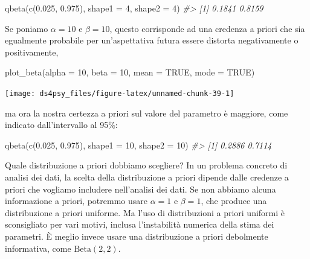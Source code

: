 \documentclass[
  11pt,
]{krantz}
\makeatletter
\newenvironment{Shaded}{\begin{snugshade}}{\end{snugshade}}
\newcommand{\AttributeTok}[1]{\textcolor[rgb]{0.61,0.61,0.61}{#1}}
\newcommand{\CommentTok}[1]{\textcolor[rgb]{0.37,0.37,0.37}{\textit{#1}}}
\newcommand{\ConstantTok}[1]{\textcolor[rgb]{0,0,0}{#1}}
\newcommand{\DecValTok}[1]{\textcolor[rgb]{0.06,0.06,0.06}{#1}}
\newcommand{\FloatTok}[1]{\textcolor[rgb]{0.06,0.06,0.06}{#1}}
\newcommand{\FunctionTok}[1]{\textcolor[rgb]{0,0,0}{#1}}
\newcommand{\NormalTok}[1]{#1}
\newenvironment{kframe}{%
\medskip{}
\setlength{\fboxsep}{.8em}
 \def\at@end@of@kframe{}%
 \ifinner\ifhmode%
  \def\at@end@of@kframe{\end{minipage}}%
  \begin{minipage}{\columnwidth}%
 \fi\fi%
 \def\FrameCommand##1{\hskip\@totalleftmargin \hskip-\fboxsep
 \colorbox{shadecolor}{##1}\hskip-\fboxsep
     \hskip-\linewidth \hskip-\@totalleftmargin \hskip\columnwidth}%
 \MakeFramed {\advance\hsize-\width
   \@totalleftmargin\z@ \linewidth\hsize
   \@setminipage}}%
 {\par\unskip\endMakeFramed%
 \at@end@of@kframe}
\renewenvironment{Shaded}{\begin{kframe}}{\end{kframe}}
\theoremstyle{definition}
\theoremstyle{definition}
\theoremstyle{definition}
\theoremstyle{definition}
\theoremstyle{remark}
\makeatother
\begin{document}
\begin{Shaded}
\begin{Highlighting}[]
\FunctionTok{qbeta}\NormalTok{(}\FunctionTok{c}\NormalTok{(}\FloatTok{0.025}\NormalTok{, }\FloatTok{0.975}\NormalTok{), }\AttributeTok{shape1 =} \DecValTok{4}\NormalTok{, }\AttributeTok{shape2 =} \DecValTok{4}\NormalTok{)}
\CommentTok{\#\textgreater{} [1] 0.1841 0.8159}
\end{Highlighting}
\end{Shaded}

Se poniamo \(\alpha=10\) e \(\beta=10\), questo corrisponde ad una credenza a priori che sia egualmente probabile per un'aspettativa futura essere distorta negativamente o positivamente,

\begin{Shaded}
\begin{Highlighting}[]
\FunctionTok{plot\_beta}\NormalTok{(}\AttributeTok{alpha =} \DecValTok{10}\NormalTok{, }\AttributeTok{beta =} \DecValTok{10}\NormalTok{, }\AttributeTok{mean =} \ConstantTok{TRUE}\NormalTok{, }\AttributeTok{mode =} \ConstantTok{TRUE}\NormalTok{)}
\end{Highlighting}
\end{Shaded}

\begin{center}\texttt{[image: ds4psy\_files/figure-latex/unnamed-chunk-39-1]} \end{center}

ma ora la nostra certezza a priori sul valore del parametro è maggiore, come indicato dall'intervallo al 95\%:

\begin{Shaded}
\begin{Highlighting}[]
\FunctionTok{qbeta}\NormalTok{(}\FunctionTok{c}\NormalTok{(}\FloatTok{0.025}\NormalTok{, }\FloatTok{0.975}\NormalTok{), }\AttributeTok{shape1 =} \DecValTok{10}\NormalTok{, }\AttributeTok{shape2 =} \DecValTok{10}\NormalTok{)}
\CommentTok{\#\textgreater{} [1] 0.2886 0.7114}
\end{Highlighting}
\end{Shaded}

Quale distribuzione a priori dobbiamo scegliere? In un problema concreto di analisi dei dati, la scelta della distribuzione a priori dipende dalle credenze a priori che vogliamo includere nell'analisi dei dati. Se non abbiamo alcuna informazione a priori, potremmo usare \(\alpha=1\) e \(\beta=1\), che produce una distribuzione a priori uniforme. Ma l'uso di distribuzioni a priori uniformi è sconsigliato per vari motivi, inclusa l'instabilità numerica della stima dei parametri. È meglio invece usare una distribuzione a priori debolmente informativa, come \(\mbox{Beta}(2, 2)\).
\end{document}
